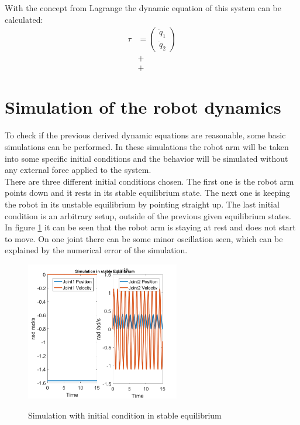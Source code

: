 With the concept from Lagrange the dynamic equation of this system can be calculated:
\begin{align*}
\tau &= \left(\begin{array}{c}
\ddot{q}_1\\ \ddot{q}_2
\end{array}\right) \\
&+ \\
&+ 
\end{align*}


\section{Simulation of the robot dynamics}

To check if the previous derived dynamic equations are reasonable, some basic simulations can be performed. In these simulations the robot arm will be taken into some specific initial conditions and the behavior will be simulated without any external force applied to the system.\\
There are three different initial conditions chosen. The first one is the robot arm points down and it rests in its stable equilibrium state. The next one is keeping the robot in its unstable equilibrium by pointing straight up. The last initial condition is an arbitrary setup, outside of the previous given equilibrium states.\\
In figure \ref{fig:stable} it can be seen that the robot arm is staying at rest and does not start to move. On one joint there can be some minor oscillation seen, which can be explained by the numerical error of the simulation.
\begin{figure}[]
	\centering
	\includegraphics[width=0.60\textwidth]{pics/SimulationinstableEquilibrium.png}\\
	\caption{Simulation with initial condition in stable equilibrium}
	\label{fig:stable}
\end{figure}

